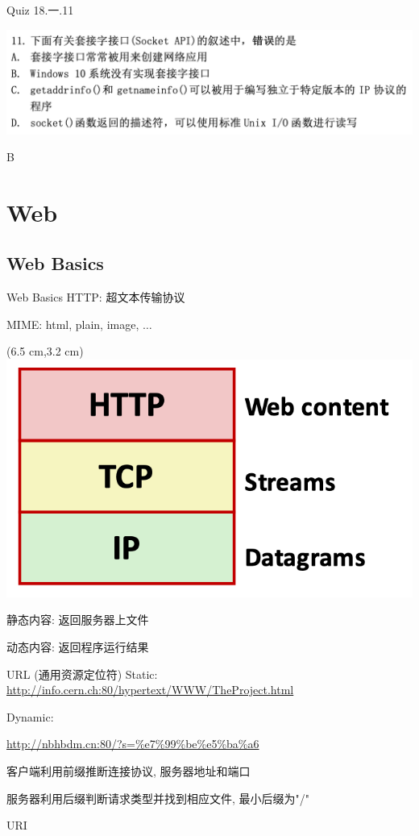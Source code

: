 \documentclass[]{beamer}
\begin{document}
\begin{frame}{Quiz}
	18.一.11
	
	{\centering
	\includegraphics[width=\linewidth]{figures/2018.1}}
	
	 B
\end{frame}

\section{Web}

\subsection{Web Basics}

\begin{frame}{Web Basics}
	HTTP: 超文本传输协议
	
	MIME: html, plain, image, $\ldots$
	
	\begin{textblock*}{10.3cm}(6.5 cm,3.2 cm)
	\includegraphics[width=0.6\linewidth]{figures/protocol hierachy}
	\end{textblock*}
	
	静态内容: 返回服务器上文件
	
	动态内容: 返回程序运行结果
\end{frame}

\begin{frame}{URL (通用资源定位符)}
	Static: \url{http://info.cern.ch:80/hypertext/WWW/TheProject.html}
	
	Dynamic: 
	
	\url{http://nbhbdm.cn:80/?s=\%e7\%99\%be\%e5\%ba\%a6}
	
	客户端利用前缀推断连接协议, 服务器地址和端口
	
	服务器利用后缀判断请求类型并找到相应文件, 最小后缀为"/"
	
	URI
\end{frame}
\end{document}
